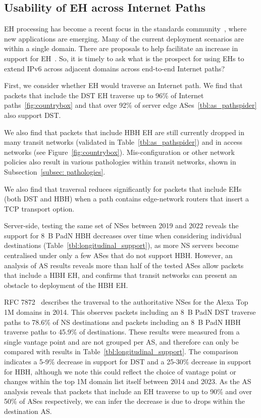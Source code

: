 \documentclass[conference]{IEEEtran}
\begin{document}
\subsection{Usability of EH across Internet Paths}

EH processing has become a recent focus in the standards community~\cite {ietf-v6ops-hbh-03}, where new applications are emerging. Many of the current deployment scenarios are within a single domain. There are proposals to help facilitate an increase in support for EH~\cite{ietf-6man-HBH-processing-06, ietf-6man-eh-limits-02}. 
So, it is timely to ask what is the prospect for using EHs to extend IPv6 across adjacent domains across end-to-end Internet paths?

First, we consider whether EH would traverse an Internet path.
We find that packets that include the DST EH traverse up to 96\% of Internet paths~\ref{fig:countrybox} and that over 92\% of server edge ASes~\ref{tbl:as_pathspider} also support DST.

We also find that packets that include HBH EH are still currently dropped in many transit networks (validated in Table~\ref{tbl:as_pathspider}) and in access networks (see Figure~\ref{fig:countrybox}). Mis-configuration or other network policies also result in various pathologies within transit networks, shown in Subsection~\ref{subsec: pathologies}. 

We also find that traversal reduces significantly for packets that include EHs (both DST and HBH) when a path contains edge-network routers that insert a TCP transport option.

Server-side, testing the same set of NSes between 2019 and 2022 reveals the support for 8~B PadN HBH decreases over time when considering individual destinations (Table~\ref{tbl:longitudinal_support}), as more NS servers become centralised under only a few ASes that do not support HBH.  However, an analysis of AS results reveals more than half of the tested ASes allow packets that include a HBH EH, and confirms that transit networks can present an obstacle to deployment of the HBH EH.

RFC 7872~\cite{RFC7872} describes the traversal to the authoritative NSes for the Alexa Top 1M domains in 2014. This observes packets including an 8~B PadN DST traverse paths to 78.6\% of NS destinations and packets including an 8~B PadN HBH traverse paths to 45.9\% of destinations. These results were measured from a single vantage point and are not grouped per AS, and therefore can only be compared with results in Table~\ref{tbl:longitudinal_support}. The comparison indicates a 5-9\% decrease in support for DST and a 25-30\% decrease in support for HBH, although we note this could reflect the choice of vantage point or changes within the top 1M domain list itself between 2014 and 2023.
As the AS analysis reveals that packets that include an EH traverse to up to 90\% and over 50\% of ASes respectively, we can infer the decrease is due to drops within the destination AS.
\end{document}
